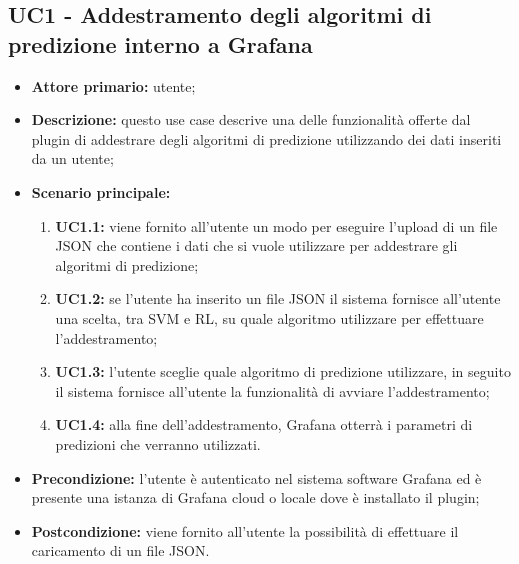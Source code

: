 \documentclass{article}
\begin{document}
	\subsection{UC1 - Addestramento degli algoritmi di predizione interno a Grafana}
	\begin{itemize}
		\item \textbf{Attore primario:} utente;
		\item \textbf{Descrizione:} questo use case descrive una delle funzionalità offerte dal plugin di addestrare degli algoritmi di predizione utilizzando dei dati inseriti da un utente;
		\item \textbf{Scenario principale:} 
			\begin{enumerate}
				\item \textbf{UC1.1:} viene fornito all'utente un modo per eseguire l'upload di un file JSON che contiene i dati che si vuole utilizzare per addestrare gli algoritmi di predizione;
				\item \textbf{UC1.2:} se l'utente ha inserito un file JSON il sistema fornisce all'utente una scelta, tra SVM e RL, su quale algoritmo utilizzare per effettuare l'addestramento;
				\item \textbf{UC1.3:} l'utente sceglie quale algoritmo di predizione utilizzare, in seguito il sistema fornisce all'utente la funzionalità di avviare l'addestramento;
				\item \textbf{UC1.4:} alla fine dell'addestramento, Grafana otterrà i parametri di predizioni che verranno utilizzati.
			\end{enumerate}
		\item \textbf{Precondizione:} l'utente è autenticato nel sistema software Grafana ed è presente una istanza di Grafana cloud o locale dove è installato il plugin;
		\item \textbf{Postcondizione:} viene fornito all'utente la possibilità di effettuare il caricamento di un file JSON.
	\end{itemize}
\end{document}
